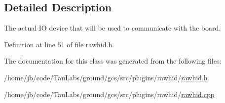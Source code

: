 \subsection{\-Detailed \-Description}
\-The actual \-I\-O device that will be used to communicate with the board. 

\-Definition at line 51 of file rawhid.\-h.



\-The documentation for this class was generated from the following files\-:\begin{DoxyCompactItemize}
\item 
/home/jb/code/\-Tau\-Labs/ground/gcs/src/plugins/rawhid/\hyperlink{rawhid_8h}{rawhid.\-h}\item 
/home/jb/code/\-Tau\-Labs/ground/gcs/src/plugins/rawhid/\hyperlink{rawhid_8cpp}{rawhid.\-cpp}\end{DoxyCompactItemize}
